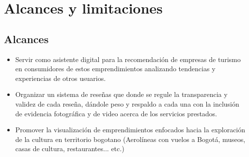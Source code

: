 \section{Alcances y limitaciones}

\subsection{Alcances}
\begin{itemize}
    \item  Servir como asistente digital para la recomendación de empresas de turismo en consumidores de estos emprendimientos analizando tendencias y experiencias de otros usuarios. 

\item Organizar un sistema de reseñas que donde se regule la transparencia y validez de cada reseña, dándole peso y respaldo a cada una con la inclusión de evidencia fotográfica y de video acerca de los servicios prestados. 

\item Promover la visualización de emprendimientos enfocados hacia la exploración de la cultura en territorio bogotano (Aerolíneas con vuelos a Bogotá, museos, casas de cultura, restaurantes... etc.) 



\end{itemize}



